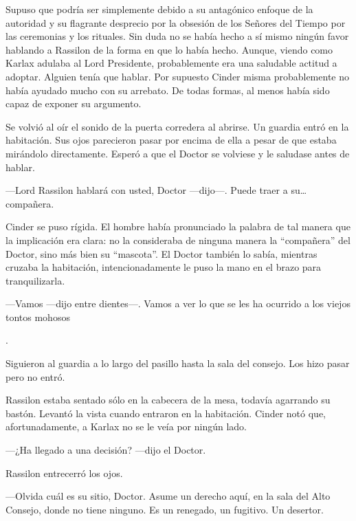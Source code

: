 Supuso que podría ser simplemente debido a su antagónico enfoque de la autoridad y su flagrante desprecio por la obsesión de los Señores del Tiempo por las ceremonias y los rituales. Sin duda no se había hecho a sí mismo ningún favor hablando a Rassilon de la forma en que lo había hecho. Aunque, viendo como Karlax adulaba al Lord Presidente, probablemente era una saludable actitud a adoptar. Alguien tenía que hablar. Por supuesto Cinder misma probablemente no había ayudado mucho con su arrebato. De todas formas, al menos había sido capaz de exponer su argumento. 

Se volvió al oír el sonido de la puerta corredera al abrirse. Un guardia entró en la habitación. Sus ojos parecieron pasar por encima de ella a pesar de que estaba mirándolo directamente. Esperó a que el Doctor se volviese y le saludase antes de hablar. 



—Lord Rassilon hablará con usted, Doctor —dijo—. Puede traer a su… compañera. 



Cinder se puso rígida. El hombre había pronunciado la palabra de tal manera que la implicación era clara: no la consideraba de ninguna manera la ``compañera'' del Doctor, sino más bien su ``mascota''. El Doctor también lo sabía, mientras cruzaba la habitación, intencionadamente le puso la mano en el brazo para tranquilizarla. 



—Vamos —dijo entre dientes—. Vamos a ver lo que se les ha ocurrido a los viejos tontos mohosos

. 

Siguieron al guardia a lo largo del pasillo hasta la sala del consejo. Los hizo pasar pero no entró. 

Rassilon estaba sentado sólo en la cabecera de la mesa, todavía agarrando su bastón. Levantó la vista cuando entraron en la habitación. Cinder notó que, afortunadamente, a Karlax no se le veía por ningún lado. 



—¿Ha llegado a una decisión? —dijo el Doctor. 



Rassilon entrecerró los ojos. 



—Olvida cuál es su sitio, Doctor. Asume un derecho aquí, en la sala del Alto Consejo, donde no tiene ninguno. Es un renegado, un fugitivo. Un desertor. 



